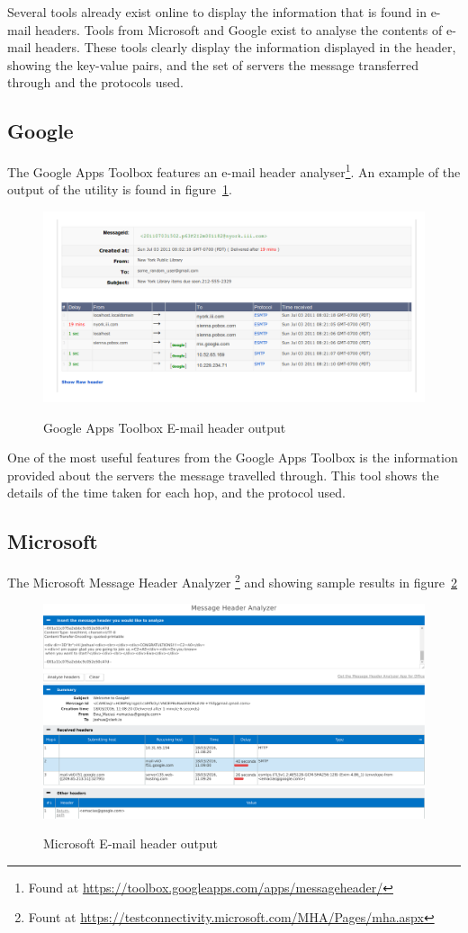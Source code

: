 Several tools already exist online to display the information that is found in e-mail headers.  Tools from Microsoft and Google exist to analyse the contents of e-mail headers.  These tools clearly display the information displayed in the header, showing the key-value pairs, and the set of servers the message transferred through and the protocols used.  

\subsection{Google}
The Google Apps Toolbox features an e-mail header analyser\footnote{Found at \url{https://toolbox.googleapps.com/apps/messageheader/}}. An example of the output of the utility is found in figure~\ref{fig:goo}.

\begin{figure}
\centering %
\includegraphics[width=0.8\linewidth]{google-header} 
\label{fig:goo}
\caption{Google Apps Toolbox E-mail header output}
\end{figure}

One of the most useful features from the Google Apps Toolbox is the information provided about the servers the message travelled through.  This tool shows the details of the time taken for each hop, and the protocol used.  

\subsection{Microsoft}
The Microsoft Message Header Analyzer \footnote{Fount at \url{https://testconnectivity.microsoft.com/MHA/Pages/mha.aspx}} and showing sample results in figure~\ref{fig:mic}

\begin{figure}
\centering 
\includegraphics[width=0.8\linewidth]{microsoft-header} 
\label{fig:mic}
\caption{Microsoft E-mail header output}
\end{figure}

